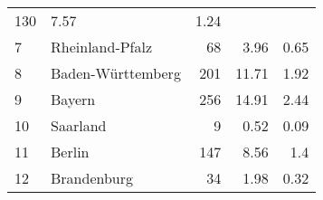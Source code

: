 \begin{longtable}{lXrrr}
       \num{130} &
       \num[round-mode=places,round-precision=2]{7,57} &
         \num[round-mode=places,round-precision=2]{1,24} \\

     7 &
     \multicolumn{1}{X}{ Rheinland-Pfalz   } &


       \num{68} &
       \num[round-mode=places,round-precision=2]{3,96} &
         \num[round-mode=places,round-precision=2]{0,65} \\

     8 &
     \multicolumn{1}{X}{ Baden-Württemberg   } &


       \num{201} &
       \num[round-mode=places,round-precision=2]{11,71} &
         \num[round-mode=places,round-precision=2]{1,92} \\

     9 &
     \multicolumn{1}{X}{ Bayern   } &


       \num{256} &
       \num[round-mode=places,round-precision=2]{14,91} &
         \num[round-mode=places,round-precision=2]{2,44} \\

     10 &
     \multicolumn{1}{X}{ Saarland   } &


       \num{9} &
       \num[round-mode=places,round-precision=2]{0,52} &
         \num[round-mode=places,round-precision=2]{0,09} \\

     11 &
     \multicolumn{1}{X}{ Berlin   } &


       \num{147} &
       \num[round-mode=places,round-precision=2]{8,56} &
         \num[round-mode=places,round-precision=2]{1,4} \\

     12 &
     \multicolumn{1}{X}{ Brandenburg   } &


       \num{34} &
       \num[round-mode=places,round-precision=2]{1,98} &
         \num[round-mode=places,round-precision=2]{0,32} \\


\end{longtable}
